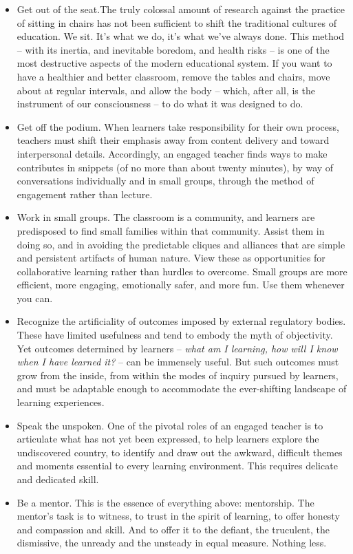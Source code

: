 \documentclass[10pt,DIV09,letterpaper,oneside,headsepline]{scrreprt}
\begin{document}
\begin{itemize}
\item Get out of the seat.The truly colossal amount of research against the practice of sitting in chairs has not been sufficient to shift the traditional cultures of education. We sit. It's what we do, it's what we've always done. This method -- with its inertia, and inevitable boredom, and health risks -- is one of the most destructive aspects of the modern educational system. If you want to have a healthier and better classroom, remove the tables and chairs, move about at regular intervals, and allow the body -- which, after all, is the instrument of our consciousness -- to do what it was designed to do.

\item Get off the podium. When learners take responsibility for their own process, teachers must shift their emphasis away from content delivery and toward interpersonal details. Accordingly, an engaged teacher finds ways to make contributes in snippets (of no more than about twenty minutes), by way of conversations individually and in small groups, through the method of engagement rather than lecture.

\item Work in small groups. The classroom is a community, and learners are predisposed to find small families within that community. Assist them in doing so, and in avoiding the predictable cliques and alliances that are simple and persistent artifacts of human nature. View these as opportunities for collaborative learning rather than hurdles to overcome. Small groups are more efficient, more engaging, emotionally safer, and more fun. Use them whenever you can.

\item Recognize the artificiality of outcomes imposed by external regulatory bodies. These have limited usefulness and tend to embody the myth of objectivity. Yet outcomes determined by learners -- \textit{what am I learning, how will I know when I have learned it?} -- can be immensely useful. But such outcomes must grow from the inside, from within the modes of inquiry pursued by learners, and must be adaptable enough to accommodate the ever-shifting landscape of learning experiences.

\item Speak the unspoken. One of the pivotal roles of an engaged teacher is to articulate what has not yet been expressed, to help learners explore the undiscovered country, to identify and draw out the awkward, difficult themes and moments essential to every learning environment. This requires delicate and dedicated skill.

\item Be a mentor. This is the essence of everything above: mentorship. The mentor’s task is to witness, to trust in the spirit of learning, to offer honesty and compassion and skill. And to offer it to the defiant, the truculent, the dismissive, the unready and the unsteady in equal measure. Nothing less.

\end{itemize}
\end{document}
